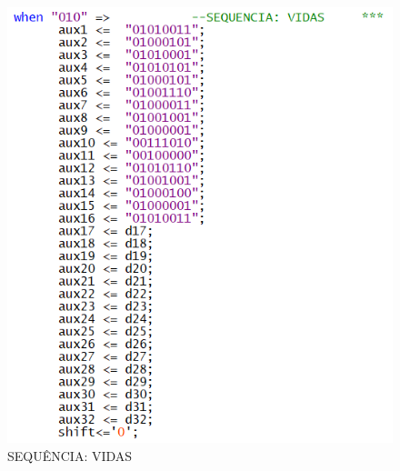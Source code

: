 \documentclass[14pt, oneside]{book}
\theoremstyle{definition}
\begin{document}
                \begin{figure}[H]
                    \centering
                    \includegraphics[scale=1]{lcdexample3.png}
                    \caption{SEQUÊNCIA: VIDAS}
                    \label{lcdexample3}
                \end{figure}
                
\end{document}
